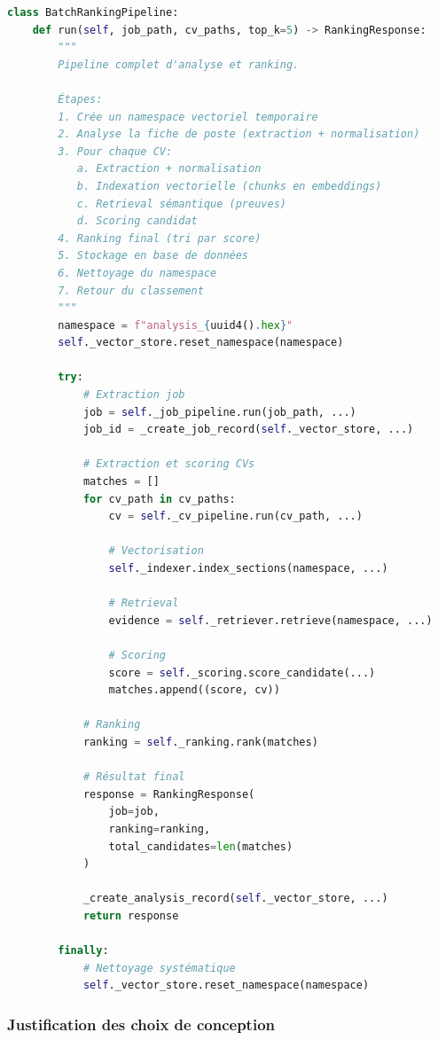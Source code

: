 \documentclass[12pt,a4paper,oneside]{book}
\begin{document}
\begin{lstlisting}[language=Python]
class BatchRankingPipeline:
    def run(self, job_path, cv_paths, top_k=5) -> RankingResponse:
        """
        Pipeline complet d'analyse et ranking.
        
        Étapes:
        1. Crée un namespace vectoriel temporaire
        2. Analyse la fiche de poste (extraction + normalisation)
        3. Pour chaque CV:
           a. Extraction + normalisation
           b. Indexation vectorielle (chunks en embeddings)
           c. Retrieval sémantique (preuves)
           d. Scoring candidat
        4. Ranking final (tri par score)
        5. Stockage en base de données
        6. Nettoyage du namespace
        7. Retour du classement
        """
        namespace = f"analysis_{uuid4().hex}"
        self._vector_store.reset_namespace(namespace)
        
        try:
            # Extraction job
            job = self._job_pipeline.run(job_path, ...)
            job_id = _create_job_record(self._vector_store, ...)
            
            # Extraction et scoring CVs
            matches = []
            for cv_path in cv_paths:
                cv = self._cv_pipeline.run(cv_path, ...)
                
                # Vectorisation
                self._indexer.index_sections(namespace, ...)
                
                # Retrieval
                evidence = self._retriever.retrieve(namespace, ...)
                
                # Scoring
                score = self._scoring.score_candidate(...)
                matches.append((score, cv))
            
            # Ranking
            ranking = self._ranking.rank(matches)
            
            # Résultat final
            response = RankingResponse(
                job=job,
                ranking=ranking,
                total_candidates=len(matches)
            )
            
            _create_analysis_record(self._vector_store, ...)
            return response
        
        finally:
            # Nettoyage systématique
            self._vector_store.reset_namespace(namespace)
\end{lstlisting}

\subsubsection{Justification des choix de conception}
\end{document}
